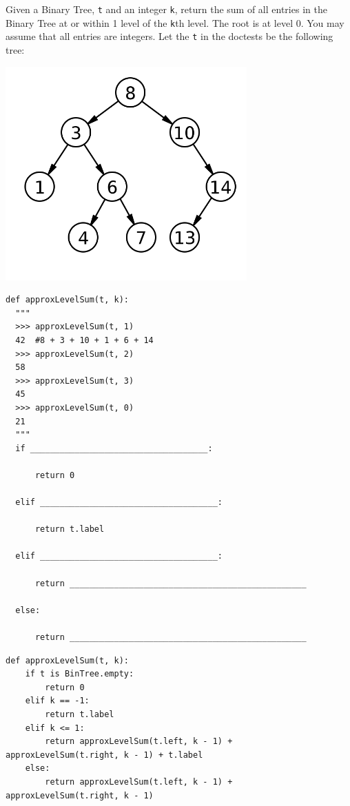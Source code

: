 \documentclass{exam}
\begin{document}
\begin{questions}
\item Given a Binary Tree, \texttt{t} and an integer \texttt{k}, return the sum of all entries 
in the Binary Tree at or within 1 level of the \texttt{k}th level. The root is at level 0. You may assume that all entries are integers. Let the \texttt{t} in the doctests be the following tree:
\begin{center}
 \includegraphics[scale=0.7]{approxLevelSum}
\end{center}

\begin{lstlisting}
def approxLevelSum(t, k):
  """
  >>> approxLevelSum(t, 1)
  42  #8 + 3 + 10 + 1 + 6 + 14 
  >>> approxLevelSum(t, 2)
  58 
  >>> approxLevelSum(t, 3)
  45
  >>> approxLevelSum(t, 0)
  21
  """
  if ____________________________________:

      return 0

  elif ____________________________________:

      return t.label

  elif ____________________________________:

      return ________________________________________________

  else:

      return ________________________________________________
\end{lstlisting}

\begin{solution}
\begin{lstlisting}
def approxLevelSum(t, k):
    if t is BinTree.empty:
        return 0
    elif k == -1:
        return t.label
    elif k <= 1:
        return approxLevelSum(t.left, k - 1) + 
approxLevelSum(t.right, k - 1) + t.label
    else:
        return approxLevelSum(t.left, k - 1) + 
approxLevelSum(t.right, k - 1)
\end{lstlisting}
\end{solution}
\end{questions}
\clearpage
\end{document}
